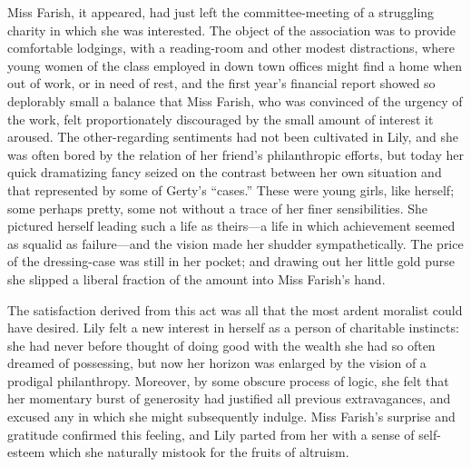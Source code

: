 \documentclass[12pt,a4paper]{book}
\begin{document}
Miss Farish, it appeared, had just left the committee-meeting of
a struggling charity in which she was interested. The object of
the association was to provide comfortable lodgings, with a
reading-room and other modest distractions, where young women of
the class employed in down town offices might find a home when
out of work, or in need of rest, and the first year's
financial report showed so deplorably small a balance that Miss
Farish, who was convinced of the urgency of the work, felt
proportionately discouraged by the small amount of interest it
aroused. The other-regarding sentiments had not been cultivated
in Lily, and she was often bored by the relation of her friend's
philanthropic efforts, but today her quick dramatizing fancy
seized on the contrast between her own situation and that
represented by some of Gerty's ``cases.'' These were young girls,
like herself; some perhaps pretty, some not without a trace of
her finer sensibilities. She pictured herself leading such a life
as theirs---a life in which achievement seemed as squalid as
failure---and the vision made her shudder sympathetically. The
price of the dressing-case was still in her pocket; and drawing
out her little gold purse she slipped a liberal fraction of the
amount into Miss Farish's hand.





The satisfaction derived from this act was all that the most
ardent moralist could have desired. Lily felt a new interest in
herself as a person of charitable instincts: she had never before
thought of doing good with the wealth she had so often dreamed of
possessing, but now her horizon was enlarged by the vision of a
prodigal philanthropy. Moreover, by some obscure process of
logic, she felt that her momentary burst of generosity had
justified all previous extravagances, and excused any in which
she might subsequently indulge. Miss Farish's surprise and
gratitude confirmed this feeling, and Lily parted from her with a
sense of self-esteem which she naturally mistook for the fruits
of altruism.
\end{document}
